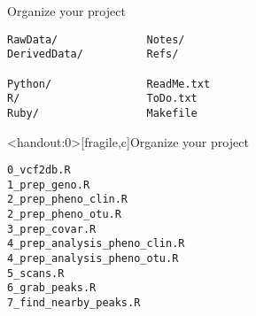 \documentclass[aspectratio=169,12pt,t]{beamer}
\begin{document}
\begin{frame}[fragile,c]{Organize your project}

\begin{center}
\begin{minipage}[c]{10.3cm}
\begin{semiverbatim}
\lstset{basicstyle=\normalsize}
\begin{lstlisting}[linewidth=10.3cm]
RawData/              Notes/
DerivedData/          Refs/

Python/               ReadMe.txt
R/                    ToDo.txt
Ruby/                 Makefile
\end{lstlisting}
\end{semiverbatim}
\end{minipage}
\end{center}


\end{frame}


\begin{frame}<handout:0>[fragile,c]{Organize your project}

\addtocounter{framenumber}{-1}

\begin{center}
\begin{minipage}[c]{10.3cm}
\begin{semiverbatim}
\lstset{basicstyle=\normalsize}
\begin{lstlisting}[linewidth=10.3cm]
0_vcf2db.R
1_prep_geno.R
2_prep_pheno_clin.R
2_prep_pheno_otu.R
3_prep_covar.R
4_prep_analysis_pheno_clin.R
4_prep_analysis_pheno_otu.R
5_scans.R
6_grab_peaks.R
7_find_nearby_peaks.R
\end{lstlisting}
\end{semiverbatim}
\end{minipage}
\end{center}

\end{frame}
\end{document}
